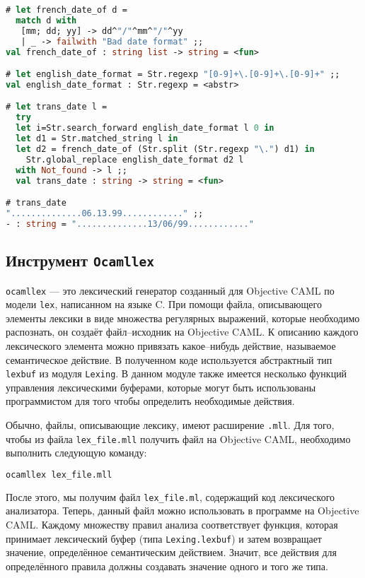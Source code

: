 \begin{lstlisting}[language=Caml]
# let french_date_of d =
  match d with
   [mm; dd; yy] -> dd^"/"^mm^"/"^yy
   | _ -> failwith "Bad date format" ;;
val french_date_of : string list -> string = <fun>

# let english_date_format = Str.regexp "[0-9]+\.[0-9]+\.[0-9]+" ;;
val english_date_format : Str.regexp = <abstr>

# let trans_date l =
  try
  let i=Str.search_forward english_date_format l 0 in
  let d1 = Str.matched_string l in
  let d2 = french_date_of (Str.split (Str.regexp "\.") d1) in
    Str.global_replace english_date_format d2 l
  with Not_found -> l ;;
  val trans_date : string -> string = <fun>

# trans_date
"..............06.13.99............" ;;
- : string = "..............13/06/99............"
\end{lstlisting}

\subsection{Инструмент \texttt{Ocamllex}}

\texttt{ocamllex} --- это лексический генератор созданный для Objective CAML по
модели \texttt{lex}, написанном на языке C. При помощи файла, описывающего
элементы лексики в виде множества регулярных выражений, которые необходимо
распознать, он создаёт файл--исходник на Objective CAML. К описанию каждого
лексического элемента можно привязать какое--нибудь действие, называемое
семантическое действие. В полученном коде используется абстрактный тип
\texttt{lexbuf} из модуля \texttt{Lexing}. В данном модуле также имеется
несколько функций управления лексическими буферами, которые могут быть
использованы программистом для того чтобы определить необходимые действия.

Обычно, файлы, описывающие лексику, имеют расширение \texttt{.mll}. Для того,
чтобы из файла \texttt{lex\_file.mll} получить файл на Objective CAML,
необходимо выполнить следующую команду:

\begin{lstlisting}[language=Caml]
ocamllex lex_file.mll
\end{lstlisting}

После этого, мы получим файл \texttt{lex\_file.ml}, содержащий код лексического
анализатора. Теперь, данный файл можно использовать в программе на Objective
CAML. Каждому множеству правил анализа соответствует функция, которая принимает
лексический буфер (типа \texttt{Lexing.lexbuf}) и затем возвращает значение,
определённое семантическим действием. Значит, все действия для определённого
правила должны создавать значение одного и того же типа.

